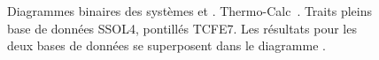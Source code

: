 \begin{figure}[h]
  \centering
  \hfill
  
  \caption{\label{fig:binaires_fe}Diagrammes binaires des systèmes \protect{}  et \protect{} . Thermo-Calc~\cite{Andersson2002,Borgenstam2000}. Traits pleins base de données SSOL4, pontillés TCFE7. Les résultats pour les deux bases de données se superposent dans le diagramme .}
\end{figure}

